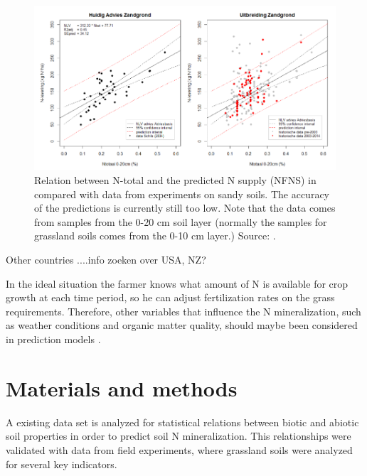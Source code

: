 \documentclass[10pt,twoside,dutch,english]{report}
\begin{document}
		\begin{figure}[t]
			\includegraphics[width=1\linewidth]{intro_ros}
			\caption{Relation between N-total and the predicted N supply (NFNS) in compared with data from experiments on sandy soils. The accuracy of the predictions is currently still too low. Note that the data comes from samples from the 0-20 cm soil layer (normally the samples for grassland soils comes from the 0-10 cm layer.) Source:   \citet{Ros2015}. }
			\label{fig:intro_ros}
		\end{figure}
		
Other countries ....info zoeken over USA, NZ?

  In the ideal situation the farmer knows what amount of N is available for crop growth at each time period, so he can adjust fertilization rates on the grass requirements. Therefore, other variables that influence the N mineralization, such as weather conditions and organic matter quality, should maybe been considered in prediction models \citep{Ros2015}. 

	


	
	
	
	
\chapter{Materials and methods}
A existing data set is analyzed for statistical relations between biotic and abiotic soil properties in order to predict soil N mineralization. This relationships were validated with data from field experiments, where grassland soils were analyzed for several key indicators. 
\end{document}
